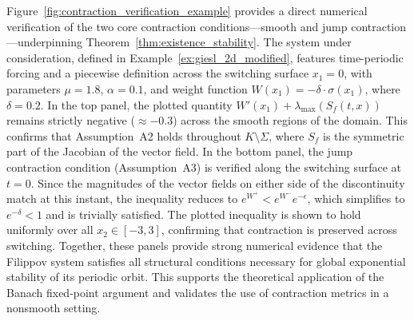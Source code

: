 \documentclass[11pt]{article}
\begin{document}
Figure~\ref{fig:contraction_verification_example} provides a direct numerical verification of the two core contraction conditions—smooth and jump contraction—underpinning Theorem~\ref{thm:existence_stability}. The system under consideration, defined in Example~\ref{ex:giesl_2d_modified}, features time-periodic forcing and a piecewise definition across the switching surface \( x_1 = 0 \), with parameters \( \mu = 1.8 \), \( \alpha = 0.1 \), and weight function \( W(x_1) = -\delta \cdot \sigma(x_1) \), where \( \delta = 0.2 \). In the top panel, the plotted quantity \( W'(x_1) + \lambda_{\max}(S_f(t,x)) \) remains strictly negative (\( \approx -0.3 \)) across the smooth regions of the domain. This confirms that Assumption~A2 holds throughout \( K \setminus \Sigma \), where \( S_f \) is the symmetric part of the Jacobian of the vector field. In the bottom panel, the jump contraction condition (Assumption~A3) is verified along the switching surface at \( t = 0 \). Since the magnitudes of the vector fields on either side of the discontinuity match at this instant, the inequality reduces to \( e^{W^+} < e^{W^-} e^{-\epsilon} \), which simplifies to \( e^{-\delta} < 1 \) and is trivially satisfied. The plotted inequality is shown to hold uniformly over all \( x_2 \in [-3, 3] \), confirming that contraction is preserved across switching. Together, these panels provide strong numerical evidence that the Filippov system satisfies all structural conditions necessary for global exponential stability of its periodic orbit. This supports the theoretical application of the Banach fixed-point argument and validates the use of contraction metrics in a nonsmooth setting.

\
\end{document}
